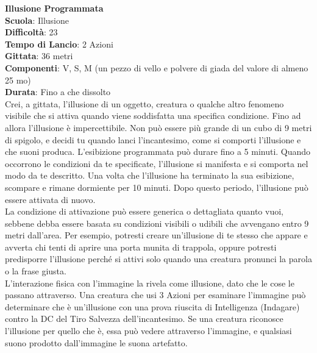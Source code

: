 \begin{multicols}{2}
\medskip\textbf{Illusione Programmata}\\
\textbf{Scuola}: Illusione\\
\textbf{Difficoltà}: 23\\
\textbf{Tempo di Lancio}: 2 Azioni\\
\textbf{Gittata}: 36 metri\\
\textbf{Componenti}: V, S, M (un pezzo di vello e polvere di giada del valore di almeno 25 mo)\\
\textbf{Durata}: Fino a che dissolto\\
Crei, a gittata, l'illusione di un oggetto, creatura o qualche altro fenomeno visibile che si attiva quando viene soddisfatta una specifica condizione. Fino ad allora l'illusione è impercettibile. Non può essere più grande di un cubo di 9 metri di spigolo, e decidi tu quando lanci l'incantesimo, come si comporti l'illusione e che suoni produca. L'esibizione programmata può durare fino a 5 minuti. Quando occorrono le condizioni da te specificate, l'illusione si manifesta e si comporta nel modo da te descritto. Una volta che l'illusione ha terminato la sua esibizione, scompare e rimane dormiente per 10 minuti. Dopo questo periodo, l'illusione può essere attivata di nuovo.\\
La condizione di attivazione può essere generica o dettagliata quanto vuoi, sebbene debba essere basata su condizioni visibili o udibili che avvengano entro 9 metri dall'area. Per esempio, potresti creare un'illusione di te stesso che appare e avverta chi tenti di aprire una porta munita di trappola, oppure potresti predisporre l'illusione perché si attivi solo quando una creatura pronunci la parola o la frase giusta.\\
L'interazione fisica con l'immagine la rivela come illusione, dato che le cose le passano attraverso. Una creatura che usi 3 Azioni per esaminare l'immagine può determinare che è un'illusione con una prova riuscita di Intelligenza (Indagare) contro la DC del Tiro Salvezza dell'incantesimo. Se una creatura riconosce l'illusione per quello che è, essa può vedere attraverso l'immagine, e qualsiasi suono prodotto dall'immagine le suona artefatto.


\end{multicols}
